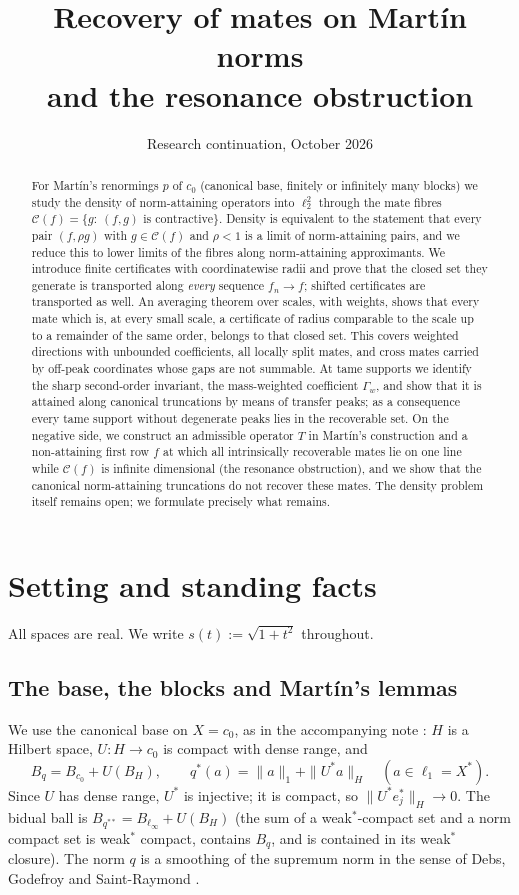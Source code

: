 \documentclass[10pt]{amsart}
\title{Recovery of mates on Mart\'in norms\\and the resonance obstruction}
\author{}
\date{Research continuation, October 2026}
\theoremstyle{definition}
\theoremstyle{remark}
\newcommand{\Cset}{\mathcal C}
\begin{document}
\begin{abstract}
For Mart\'in's renormings $p$ of $c_0$ (canonical base, finitely or
infinitely many blocks) we study the density of norm-attaining operators
into $\ell_2^2$ through the mate fibres
$\Cset(f)=\{g:\ (f,g)\text{ is contractive}\}$.  Density is equivalent to the
statement that every pair $(f,\rho g)$ with $g\in\Cset(f)$ and $\rho<1$ is a
limit of norm-attaining pairs, and we reduce this to lower limits of the
fibres along norm-attaining approximants.  We introduce finite
certificates with coordinatewise radii and prove that the closed set they
generate is transported along \emph{every} sequence $f_n\to f$; shifted
certificates are transported as well.  An averaging theorem over scales,
with weights, shows that every mate which is, at every small scale, a
certificate of radius comparable to the scale up to a remainder of the same
order, belongs to that closed set.  This covers weighted directions with
unbounded coefficients, all locally split mates, and cross mates carried by
off-peak coordinates whose gaps are not summable.  At tame supports we
identify the sharp second-order invariant, the mass-weighted coefficient
$\Gamma_w$, and show that it is attained along canonical truncations by
means of transfer peaks; as a consequence every tame support without
degenerate peaks lies in the recoverable set.  On the negative side, we
construct an admissible operator $T$ in Mart\'in's construction and a
non-attaining first row $f$ at which all intrinsically recoverable mates
lie on one line while $\Cset(f)$ is infinite dimensional (the resonance
obstruction), and we show that the canonical norm-attaining truncations do
not recover these mates.  The density problem itself remains open; we
formulate precisely what remains.
\end{abstract}
\maketitle
\tableofcontents

\section{Setting and standing facts}\label{sec:setting}

All spaces are real.  We write $s(t):=\sqrt{1+t^2}$ throughout.

\subsection{The base, the blocks and Mart\'in's lemmas}
We use the canonical base on $X=c_0$, as in the accompanying note
\cite{PrA}: $H$ is a Hilbert space, $U:H\to c_0$ is compact with dense
range, and
\[
 B_q=B_{c_0}+U(B_H),\qquad q^*(a)=\|a\|_1+\|U^*a\|_H\quad(a\in\ell_1=X^*).
\]
Since $U$ has dense range, $U^*$ is injective; it is compact, so
$\|U^*e_j^*\|_H\to0$.  The bidual ball is $B_{q^{**}}=B_{\ell_\infty}+U(B_H)$
(the sum of a weak$^*$-compact set and a norm compact set is weak$^*$
compact, contains $B_q$, and is contained in its weak$^*$ closure).  The
norm $q$ is a smoothing of the supremum norm in the sense of
Debs, Godefroy and Saint-Raymond \cite{DGS}.
\end{document}
